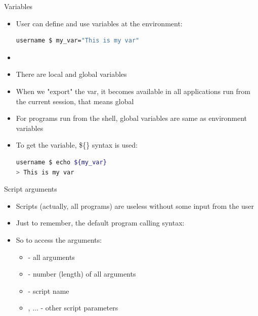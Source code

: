 \documentclass[usenames,dvipsnames,10pt,aspectratio=169]{beamer}
\begin{document}
\begin{frame}[fragile]{Variables}
    \begin{itemize}
        \item  User can define and use variables at the environment:
        \begin{lstlisting}[language=Bash, style=shellstyle]
username $ my_var="This is my var"
        \end{lstlisting}
        \item {}
        \item There are local and global variables
        \item When we "export" the var, it becomes available in all applications run from the current session, that means global 
        \item For programs run from the shell, global variables are same as environment variables
        \item To get the variable, \$\{\} syntax is used:
        \begin{lstlisting}[language=Bash, style=shellstyle]
username $ echo ${my_var}
> This is my var
        \end{lstlisting}
    \end{itemize}
\end{frame}

\begin{frame}{Script arguments}
    \begin{itemize}
        \item Scripts (actually, all programs) are useless without some input from the user
        \item Just to remember, the default program calling syntax:
        \begin{examples}
        \end{examples}
        \item So to access the arguments:
        \begin{itemize}
            \item {} - all arguments
            \item \ex{\$\{\#\}} - number (length) of all arguments
            \item {} - script name
            \item {}, ... - other script parameters
        \end{itemize}
    \end{itemize}
\end{frame}
\end{document}

